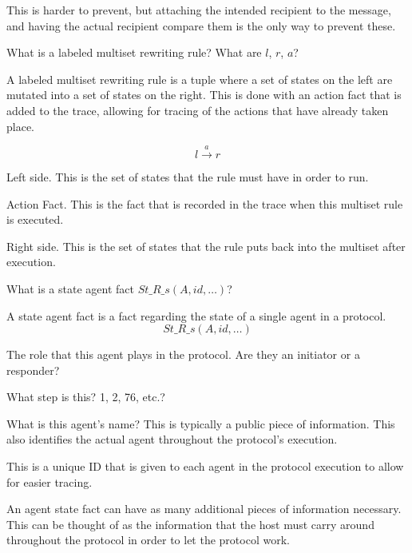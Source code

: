 \begin{questions}
\begin{solution}
    This is harder to prevent, but attaching the intended recipient to the message, and having the actual recipient compare them is the only way to prevent these.
  \end{solution}

\question{} What is a labeled multiset rewriting rule? What are $l$, $r$, $a$?
  \begin{solution}
    A labeled multiset rewriting rule is a tuple where a set of states on the left are mutated into a set of states on the right.
    This is done with an action fact that is added to the trace, allowing for tracing of the actions that have already taken place.

    \begin{equation}\label{eq:Labeled_Multiset_Rewriting_Rule}
      l \overset{a}{\rightarrow} r
    \end{equation}
    \begin{description}[noitemsep]
    \item[$l$] Left side. This is the set of states that the rule must have in order to run.
    \item[$a$] Action Fact. This is the fact that is recorded in the trace when this multiset rule is executed.
    \item[$r$] Right side. This is the set of states that the rule puts back into the multiset after execution.
    \end{description}
  \end{solution}

\question{} What is a state agent fact $St\_R\_s(A, id, \ldots)$?
  \begin{solution}
    A state agent fact is a fact regarding the state of a single agent in a protocol.
    \begin{equation}\label{eq:State_Agent_Fact}
      St\_R\_s(A, id, \ldots)
    \end{equation}
    \begin{description}[noitemsep]
    \item[$R$] The role that this agent plays in the protocol. Are they an initiator or a responder?
    \item[$s$] What step is this? 1, 2, 76, etc.?
    \item[$A$] What is this agent's name? This is typically a public piece of information.
      This also identifies the actual agent throughout the protocol's execution.
    \item[$id$] This is a unique ID that is given to each agent in the protocol execution to allow for easier tracing.
    \item[$\ldots$] An agent state fact can have as many additional pieces of information necessary.
      This can be thought of as the information that the host must carry around throughout the protocol in order to let the protocol work.
    \end{description}
  \end{solution}


\end{questions}

